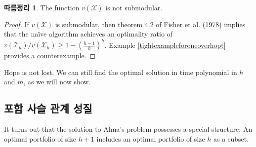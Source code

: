 \documentclass[12pt]{article} %
\newif\ifen
\newtheorem{lemma}{Lemma}
\newtheorem{corollary}{Corollary}
\theoremstyle{definition}
\newtheorem{lemma}{기본정리}
\newtheorem{corollary}{따름정리}
\theoremstyle{definition}
\begin{document}
\begin{corollary}
The function $v(\mathcal{X})$ is not submodular. 
\end{corollary}
\begin{proof}
If $v(\mathcal{X})$ is submodular, then theorem 4.2 of Fisher et al. (1978) implies that the na\"ive algorithm achieves an optimality ratio of $v(\mathcal{T}_h) / v(\mathcal{X}_h)  \geq 1 - \left(\frac{h-1}{h}\right)^h$. Example \ref{tightexampleforoneoverhopt} provides a counterexample.
\end{proof}


Hope is not lost. We can still find the optimal solution in time polynomial in $h$ and $m$, as we will now show.

\ifen \subsection{The nestedness property}  \else \subsection{포함 사슬 관계 성질} \fi
It turns out that the solution to Alma's problem possesses a special structure: An optimal portfolio of size $h+1$ includes an optimal portfolio of size $h$ as a subset.

%
\end{document}
